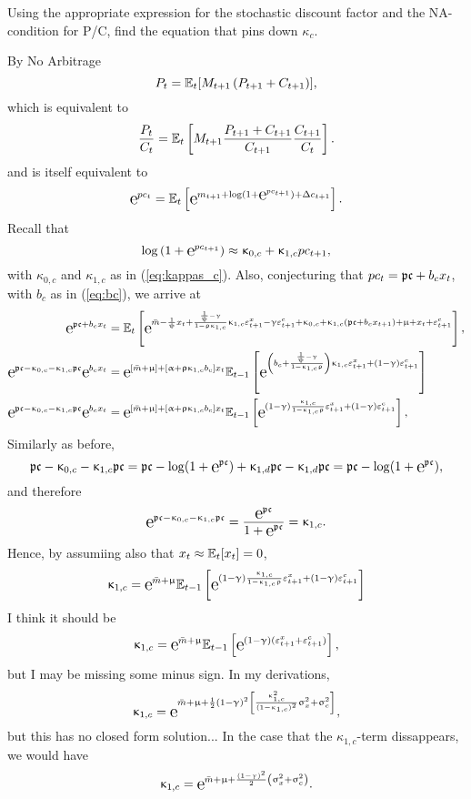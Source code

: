 Using the appropriate expression for the stochastic discount factor and the NA-condition for P/C, find the equation that pins down $\kappa_c$.

\solution By No Arbitrage
\begin{equation}
	P_t = \mathbb{E}_t[M_{t+1}\left(P_{t+1} + C_{t+1}\right)],
\end{equation}
which is equivalent to
$$
	\frac{P_t}{C_t} = \mathbb{E}_t\left[M_{t+1}\frac{P_{t+1}+C_{t+1}}{C_{t+1}}\frac{C_{t+1}}{C_t}\right].
$$
and is itself equivalent to 
\begin{equation}
	\e{pc_t} = \E_t\left[\e{m_{t+1} + \log\left(1+\e{pc_{t+1}}\right) + \Delta c_{t+1}}\right].
\end{equation}
Recall that
$$
	\log\left(1+\e{pc_{t+1}}\right)\approx \kappa_{0,c} + \kappa_{1,c}pc_{t+1},
$$
with 
$\kappa_{0,c}$ and $\kappa_{1,c}$ as in (\ref{eq:kappas_c}). Also, conjecturing that $pc_{t} = \mathfrak{pc} + b_c x_{t}$, with $b_c$ as in (\ref{eq:bc}), we arrive at
$$
	\begin{aligned}
		\e{\pcbar + b_c x_t} &= \E_t\left[\e{\bar{m} - \frac{1}{\psi}x_t + \frac{\frac{1}{\psi}-\gamma}{1-\rho\kappa_{1,c}}\kappa_{1,c}\varepsilon_{t+1}^x - \gamma\varepsilon_{t+1}^c+\kappa_{0,c} + \kappa_{1,c} (\pcbar + b_c x_{t+1}) + \mu + x_{t} + \varepsilon_{t+1}^c}\right],\\
		\e{\pcbar -\kappa_{0,c} - \kappa_{1,c}\pcbar}\e{b_c x_t} &= \e{[\bar{m}+\mu] + \left[\alpha + \rho\kappa_{1,c}b_c\right]x_t}\E_{t-1}\left[\e{ \left(b_c +\frac{\ies-\gamma}{1-\kappa_{1,c}\rho}\right)\kappa_{1,c}\varepsilon_{t+1}^x + (1-\gamma)\varepsilon_{t+1}^c}\right]\\
		\e{\pcbar -\kappa_{0,c} - \kappa_{1,c}\pcbar}\e{b_c x_t} &= \e{[\bar{m}+\mu] + \left[\alpha + \rho\kappa_{1,c}b_c\right]x_t}\E_{t-1}\left[\e{ (1-\gamma)\frac{\kappa_{1,c}}{1-\kappa_{1,c}\rho} \varepsilon_{t+1}^x + (1-\gamma)\varepsilon_{t+1}^c}\right],\\
	\end{aligned}
$$ 
Similarly as before,
\begin{equation}
	\pcbar - \kappa_{0,c} - \kappa_{1,c} \pcbar = \pcbar - \log(1+\e{\pcbar}) + \kappa_{1,d}\pcbar - \kappa_{1,d}\pcbar = \pcbar  - \log(1+\e{\pcbar}),
\end{equation}
and therefore
$$
\e{\pcbar -\kappa_{0,c} - \kappa_{1,c} \pcbar} = \frac{\e{\pcbar}}{1+\e{\pcbar}} = \kappa_{1,c}.
$$
Hence, by assumiing also that $x_t \approx \mathbb{E}_t[x_t]= 0$,
$$
\begin{aligned}
		\kappa_{1,c} &= \e{\bar{m}+\mu}\E_{t-1}\left[\e{ (1-\gamma)\frac{\kappa_{1,c}}{1-\kappa_{1,c}\rho} \varepsilon_{t+1}^x + (1-\gamma)\varepsilon_{t+1}^c}\right]\\
\end{aligned}
$$
I think it should be 
$$
	\kappa_{1,c} =\e{\bar{m}+\mu} \E_{t-1} \left[ \e{ (1-\gamma)(\varepsilon_{t+1}^x +\varepsilon_{t+1}^c)}\right],
$$	
but I may be missing some minus sign. In my derivations,
$$
	\kappa_{1,c} = \e{\bar{m}+\mu + \frac{1}{2}(1-\gamma)^2\left[\frac{\kappa_{1,c}^2}{(1-\kappa_{1,c})^2}\sigma_x^2 + \sigma_c^2\right] },
$$
but this has no closed form solution... In the case that the $\kappa_{1,c}$-term dissappears, we would have
$$
	\kappa_{1,c} = \e{\bar{m} + \mu + \frac{(1-\gamma)^2}{2}\left(\sigma_x^2 + \sigma_c^2\right)}.
$$
